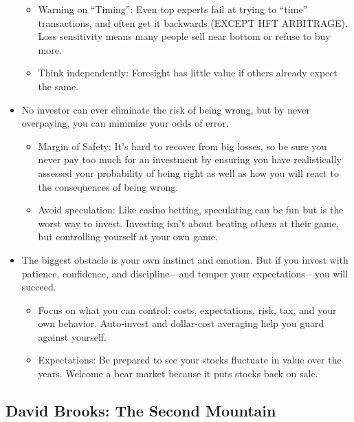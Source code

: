\documentclass[
]{article}
\begin{document}
\begin{itemize}
  \begin{itemize}
  \item
    Warning on ``Timing'': Even top experts fail at trying to ``time''
    transactions, and often get it backwards (EXCEPT HFT ARBITRAGE).
    Loss sensitivity means many people sell near bottom or refuse to buy
    more.
  \item
    Think independently: Foresight has little value if others already
    expect the same.
  \end{itemize}
\item
  No investor can ever eliminate the risk of being wrong, but by never
  overpaying, you can minimize your odds of error.

  \begin{itemize}
  \item
    Margin of Safety: It's hard to recover from big losses, so be sure
    you never pay too much for an investment by ensuring you have
    realistically assessed your probability of being right as well as
    how you will react to the consequences of being wrong.
  \item
    Avoid speculation: Like casino betting, speculating can be fun but
    is the worst way to invest. Investing isn't about beating others at
    their game, but controlling yourself at your own game.
  \end{itemize}
\item
  The biggest obstacle is your own instinct and emotion. But if you
  invest with patience, confidence, and discipline---and temper your
  expectations---you will succeed.

  \begin{itemize}
  \item
    Focus on what you can control: costs, expectations, risk, tax, and
    your own behavior. Auto-invest and dollar-cost averaging help you
    guard against yourself.
  \item
    Expectations: Be prepared to see your stocks fluctuate in value over
    the years. Welcome a bear market because it puts stocks back on
    sale.
  \end{itemize}
\end{itemize}

\hypertarget{david-brooks-the-second-mountain}{%
\subsection{David Brooks: The Second
Mountain}\label{david-brooks-the-second-mountain}}
\end{document}
